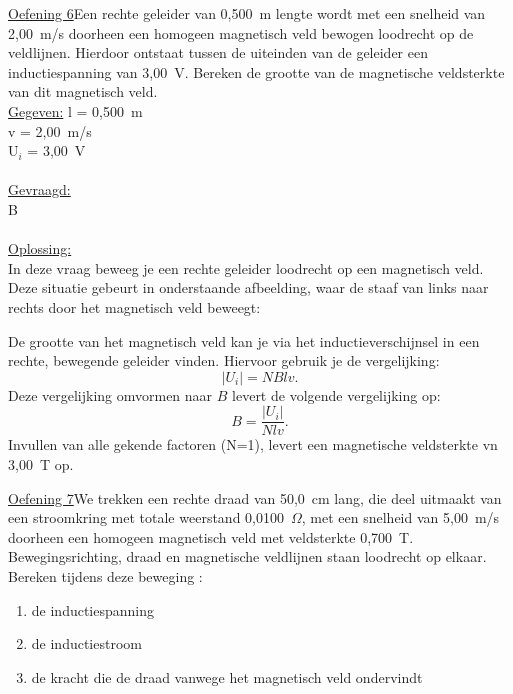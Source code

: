 \documentclass[a4paper,12pt,twoside]{article}%
\begin{document}
\underline{Oefening 6}\newline	Een rechte geleider van 0,500~m lengte wordt met een snelheid van 2,00~m/s doorheen een homogeen magnetisch veld bewogen loodrecht op de veldlijnen. Hierdoor ontstaat tussen de uiteinden van de geleider een inductiespanning van 3,00~V. 
Bereken de grootte van de magnetische veldsterkte van dit magnetisch veld.\\

\underline{Gegeven:}\newline
l = 0,500~m\\
v = 2,00~m/s\\
U$_i$ = 3,00~V\\
\\
\underline{Gevraagd:}\\
B\\ \\
\underline{Oplossing:}\\
In deze vraag beweeg je een rechte geleider loodrecht op een magnetisch veld. Deze situatie gebeurt in onderstaande afbeelding, waar de staaf van links naar rechts  door het magnetisch veld beweegt:
\begin{figure}[h]
	\centering
\end{figure}

De grootte van het magnetisch veld kan je via het inductieverschijnsel in een rechte, bewegende geleider vinden. Hiervoor gebruik je de vergelijking:\[\left|U_i\right|= NBlv.\]
Deze vergelijking omvormen naar $B$ levert de volgende vergelijking op:
\[B = \frac{\left|U_i\right|}{Nlv}.\]
Invullen van alle gekende factoren (N=1), levert een magnetische veldsterkte vn 3,00~T op.


\newpage






\underline{Oefening 7}\newline	We trekken een rechte draad van 50,0~cm lang, die deel uitmaakt van een stroomkring met totale weerstand 0,0100~$\Omega$, met een snelheid van 5,00~m/s doorheen een homogeen magnetisch veld met veldsterkte 0,700~T. Bewegingsrichting, draad en magnetische veldlijnen staan loodrecht op elkaar. 
Bereken tijdens deze beweging :
\begin{enumerate}
	\item de inductiespanning
	\item	de inductiestroom
	\item	de kracht die de draad vanwege het magnetisch veld ondervindt
\end{enumerate} 
\end{document}
